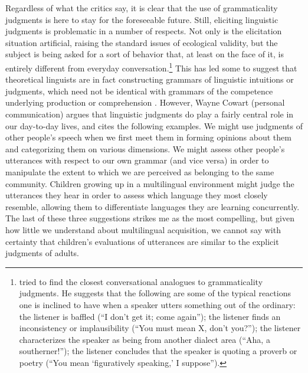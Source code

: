 Regardless of what the critics say, it is clear that the use of grammaticality judgments is here to stay for the foreseeable future. Still, eliciting linguistic judgments is problematic in a number of respects. Not only is the elicitation situation artificial, raising the standard issues of ecological validity, but the subject is being asked for a sort of behavior that, at least on the face of it, is entirely different from
everyday conversation.\footnote{\citet{Householder1971,Householder1973} tried to find the closest conversational analogues to grammaticality judgments. He suggests that the following are some of the typical reactions one is inclined to have when a speaker utters something out of the ordinary: the listener is baffled (``I don't get it; come again''); the listener finds an inconsistency or implausibility (``You must mean X, don't you?''); the listener characterizes the speaker as being from another dialect area (``Aha, a southerner!''); the listener concludes that the speaker is quoting a proverb or poetry (``You mean `figuratively speaking,' I suppose'').
}
 This has led some to suggest that theoretical linguists are in fact constructing grammars of linguistic intuitions or judgments, which need not be identical with grammars of the competence underlying production or comprehension \citep{Bever1970a,Birdsong1989,GleitmanEtAl1979}. However, Wayne Cowart (personal communication) argues that linguistic judgments do play a fairly central role in our day-to-day lives, and cites the following examples. We might use judgments of other people's speech when we first meet them in forming opinions about them and categorizing them on various dimensions. We might assess other people's utterances with respect to our own grammar (and vice versa) in order to manipulate the extent to which we are perceived as belonging to the same community. Children growing up in a multilingual environment might judge the utterances they hear in order to assess which language they most closely resemble, allowing them to differentiate languages they are learning concurrently. The last of these three suggestions strikes me as the most compelling, but given how little we understand about multilingual acquisition, we cannot say with certainty that children's evaluations of utterances are similar to the explicit judgments of adults.

